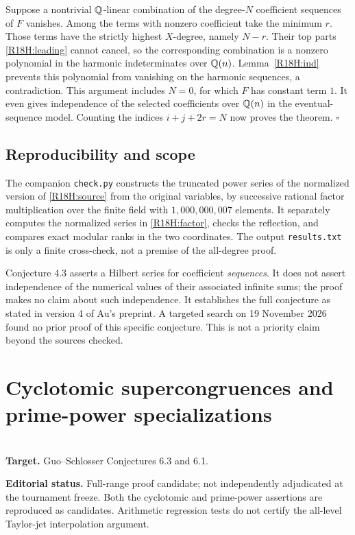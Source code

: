 \documentclass[11pt,a4paper]{article}
\begin{document}
Suppose a nontrivial $\mathbb Q$-linear combination of the degree-$N$ coefficient
sequences of $F$ vanishes. Among the terms with nonzero coefficient take
the minimum $r$. Those terms have the strictly highest $X$-degree,
namely $N-r$. Their top parts \eqref{R18H:leading} cannot cancel, so the
corresponding combination is a nonzero polynomial in the
harmonic indeterminates over $\mathbb Q(n)$. Lemma~\ref{R18H:ind} prevents this
polynomial from vanishing on the harmonic sequences, a contradiction.
This argument includes $N=0$, for which $F$ has constant term $1$.
It even gives independence of the selected coefficients over $\mathbb Q(n)$
in the eventual-sequence model. Counting the indices $i+j+2r=N$
now proves the theorem. \hfill$\square$

\subsection{Reproducibility and scope}
The companion \texttt{check.py} constructs the truncated power series
of the normalized version of \eqref{R18H:source} from the original variables,
by successive rational factor multiplication over the finite field
with $1{,}000{,}000{,}007$ elements. It separately computes the normalized
series in \eqref{R18H:factor}, checks the reflection, and compares exact
modular ranks in the two coordinates. The output \texttt{results.txt}
is only a finite cross-check, not a premise of the all-degree proof.

Conjecture 4.3 asserts a Hilbert series for coefficient \emph{sequences}.
It does not assert independence of the numerical values of their
associated infinite sums; the proof makes no claim about such
independence. It establishes the full conjecture as stated in version 4
of Au's preprint. A targeted search on 19 November 2026 found no prior
proof of this specific conjecture. This is not a priority claim beyond
the sources checked.
\endgroup


\clearpage

\section{Cyclotomic supercongruences and prime-power specializations}
\label{section:R18T}
\\[3pt]
\noindent\textbf{Target.} Guo--Schlosser Conjectures 6.3 and 6.1.

\noindent\textbf{Editorial status.} Full-range proof candidate; not independently adjudicated at the tournament freeze. Both the cyclotomic and prime-power assertions are reproduced as candidates. Arithmetic regression tests do not certify the all-level Taylor-jet interpolation argument.
\end{document}
